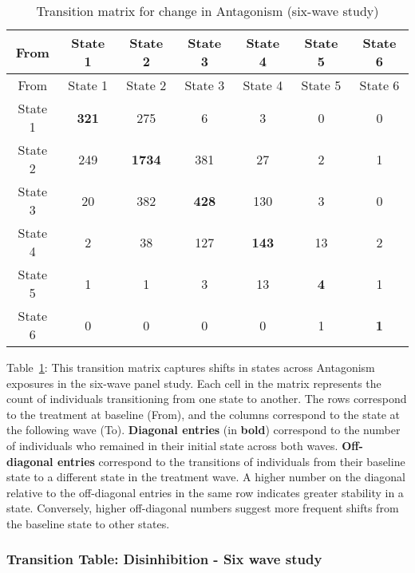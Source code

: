 \documentclass[
  single column]{article}
\begin{document}
\begin{longtable}[]{@{}ccccccc@{}}
\caption{Transition matrix for change in Antagonism (six-wave
study)}\label{tbl-table-transition-antagonism-long}\tabularnewline
\toprule\noalign{}
From & State 1 & State 2 & State 3 & State 4 & State 5 & State 6 \\
\midrule\noalign{}
\endfirsthead
\toprule\noalign{}
From & State 1 & State 2 & State 3 & State 4 & State 5 & State 6 \\
\midrule\noalign{}
\endhead
\bottomrule\noalign{}
\endlastfoot
State 1 & \textbf{321} & 275 & 6 & 3 & 0 & 0 \\
State 2 & 249 & \textbf{1734} & 381 & 27 & 2 & 1 \\
State 3 & 20 & 382 & \textbf{428} & 130 & 3 & 0 \\
State 4 & 2 & 38 & 127 & \textbf{143} & 13 & 2 \\
State 5 & 1 & 1 & 3 & 13 & \textbf{4} & 1 \\
State 6 & 0 & 0 & 0 & 0 & 1 & \textbf{1} \\
\end{longtable}

Table~\ref{tbl-table-transition-antagonism-long}: This transition matrix
captures shifts in states across Antagonism exposures in the six-wave
panel study. Each cell in the matrix represents the count of individuals
transitioning from one state to another. The rows correspond to the
treatment at baseline (From), and the columns correspond to the state at
the following wave (To). \textbf{Diagonal entries} (in \textbf{bold})
correspond to the number of individuals who remained in their initial
state across both waves. \textbf{Off-diagonal entries} correspond to the
transitions of individuals from their baseline state to a different
state in the treatment wave. A higher number on the diagonal relative to
the off-diagonal entries in the same row indicates greater stability in
a state. Conversely, higher off-diagonal numbers suggest more frequent
shifts from the baseline state to other states.

\subsubsection{Transition Table: Disinhibition - Six wave
study}\label{transition-table-disinhibition---six-wave-study}
\end{document}
